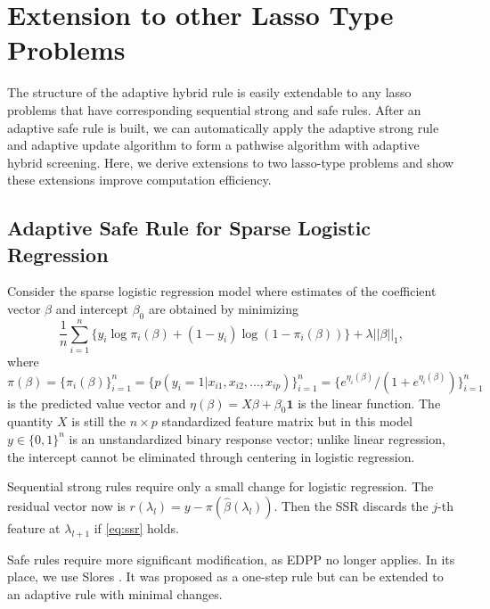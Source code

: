 \documentclass[]{interact}
\theoremstyle{plain}%
\theoremstyle{definition}
\theoremstyle{remark}
\begin{document}
\section{Extension to other Lasso Type Problems}
\label{sec:extension}

The structure of the adaptive hybrid rule is easily extendable to any lasso problems that have corresponding sequential strong and safe rules. After an adaptive safe rule is built, we can automatically apply the adaptive strong rule and adaptive update algorithm to form a pathwise algorithm with adaptive hybrid screening. Here, we derive extensions to two lasso-type problems and show these extensions improve computation efficiency.

\subsection{Adaptive Safe Rule for Sparse Logistic Regression}
\label{sec:logis}

Consider the sparse logistic regression model where estimates of the coefficient vector $\beta$ and intercept $\beta_0$ are obtained by minimizing
\begin{equation}
    \label{eq:logis}
  \frac{1}{n} \sum_{i=1}^n \big\{y_i\log\pi_i(\beta) + (1-y_i)\log(1 -\pi_i(\beta))\big\} + \lambda||\beta||_1,
\end{equation}
where $\pi(\beta)=\{\pi_i(\beta)\}_{i=1}^n=\{p(y_i=1|x_{i1},x_{i2},...,x_{ip})\}_{i=1}^n=\{e^{\eta_i(\beta)}/(1+e^{\eta_i(\beta)})\}_{i=1}^n$ is the predicted value vector and $\eta(\beta)=X\beta+\beta_0\mathbf{1}$ is the linear function. The quantity $X$ is still the $n\times p$ standardized feature matrix but in this model $y\in\{0,1\}^n$ is an unstandardized binary response vector; unlike linear regression, the intercept cannot be eliminated through centering in logistic regression.

Sequential strong rules require only a small change for logistic regression. The residual vector now is $r(\lambda_l)=y-\pi(\hat{\beta}(\lambda_l))$. Then the SSR discards the $j$-th feature at $\lambda_{l+1}$ if \eqref{eq:ssr} holds.

Safe rules require more significant modification, as EDPP no longer applies. In its place, we use Slores \citep[sparse logistic regression screening rule,][]{wang2014safe}. It was proposed as a one-step rule but can be extended to an adaptive rule with minimal changes. 
\end{document}

